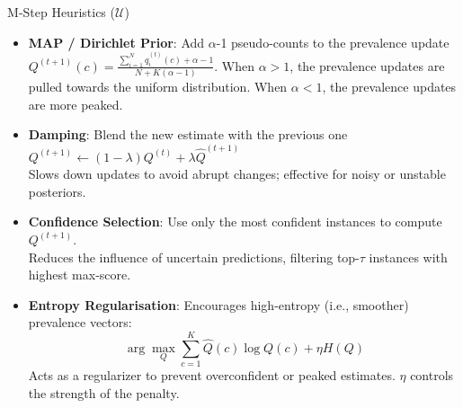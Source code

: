 \documentclass[aspectratio=169]{beamer}
\begin{document}
\begin{frame}{M‑Step Heuristics ($\mathcal{U}$)}
  \begin{itemize}
    \item \textbf{MAP / Dirichlet Prior}: Add $\alpha$-1 pseudo-counts to the prevalence update $Q^{(t+1)}(c) = \frac{\sum_{i=1}^N q_i^{(t)}(c) + \alpha - 1}{N + K(\alpha - 1)}$.
    When $\alpha>1$, the prevalence updates are pulled towards the uniform distribution. When $\alpha<1$, the prevalence updates are more peaked.\\
    \normalsize

    \item \textbf{Damping}: Blend the new estimate with the previous one $Q^{(t+1)} \gets (1-\lambda) Q^{(t)} + \lambda \hat{Q}^{(t+1)}$   \\
    
    \small Slows down updates to avoid abrupt changes; effective for noisy or unstable posteriors.
    \normalsize

    \item \textbf{Confidence Selection}: Use only the most confident instances to compute $Q^{(t+1)}$.\\
    \small Reduces the influence of uncertain predictions, filtering top-$\tau$ instances with highest max-score.
    \normalsize

    \item \textbf{Entropy Regularisation}: Encourages high-entropy (i.e., smoother) prevalence vectors:\\
    \[
        \arg\max_Q \sum_{c=1}^K \hat{Q}(c) \log Q(c) + \eta H(Q)
    \]
    \small Acts as a regularizer to prevent overconfident or peaked estimates. $\eta$ controls the strength of the penalty.
  \end{itemize}
\end{frame}
\end{document}
